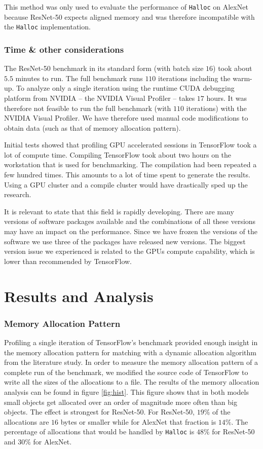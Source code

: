 \documentclass[12pt,twoside]{article}
\begin{document}
This method was only used to evaluate the performance of \texttt{Halloc} on AlexNet because ResNet-50 expects aligned memory and was therefore incompatible with the \texttt{Halloc} implementation.

\subsubsection*{Time \& other considerations}

The ResNet-50 benchmark in its standard form (with batch size $16$) took about $5.5$ minutes to run. The full benchmark runs $110$ iterations including the warm-up. To analyze only a single iteration using the runtime CUDA debugging platform from NVIDIA -- the NVIDIA Visual Profiler -- takes $17$ hours. It was therefore not feasible to run the full benchmark (with $110$ iterations) with the NVIDIA Visual Profiler. We have therefore used manual code modifications to obtain data (such as that of memory allocation pattern).

Initial tests showed that profiling GPU accelerated sessions in TensorFlow took a lot of compute time. Compiling TensorFlow took about two hours on the workstation that is used for benchmarking. The compilation had been repeated a few hundred times. This amounts to a lot of time spent to generate the results. Using a GPU cluster and a compile cluster would have drastically sped up the research.

It is relevant to state that this field is rapidly developing. There are many versions of software packages available and the combinations of all these versions may have an impact on the performance. Since we have frozen the versions of the software we use three of the packages have released new versions. The biggest version issue we experienced is related to the GPUs compute capability, which is lower than recommended by TensorFlow.

\section{Results and Analysis}
\label{sec:results-and-analysis}

\subsubsection*{Memory Allocation Pattern}
Profiling a single iteration of TensorFlow's benchmark provided enough insight in the memory allocation pattern for matching with a dynamic allocation algorithm from the literature study. In order to measure the memory allocation pattern of a complete run of the benchmark, we modified the source code of TensorFlow to write all the sizes of the allocations to a file. The results of the memory allocation analysis can be found in figure \ref{fig:hist}. This figure shows that in both models small objects get allocated over an order of magnitude more often than big objects. The effect is strongest for ResNet-50. For ResNet-50, $19\%$ of the allocations are $16$ bytes or smaller while for AlexNet that fraction is $14\%$. The percentage of allocations that would be handled by \texttt{Halloc} is $48\%$ for ResNet-50 and $30\%$ for AlexNet.
\end{document}
